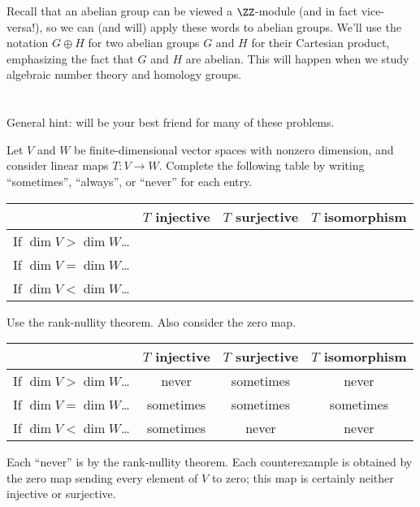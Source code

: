 \begin{abuse}
	Recall that an abelian group
	can be viewed a $\ZZ$-module (and in fact vice-versa!),
	so we can (and will) apply these words to abelian groups.
	We'll use the notation $G \oplus H$ for two abelian groups $G$ and $H$
	for their Cartesian product, emphasizing the fact that $G$ and $H$ are abelian.
	This will happen when we study algebraic number theory and homology groups.
\end{abuse}

\section{\problemhead}
General hint:
 will be your best friend
for many of these problems.

\begin{dproblem}
	Let $V$ and $W$ be finite-dimensional vector spaces
	with nonzero dimension, and consider linear maps $T \colon V \to W$.
	Complete the following table by writing
	``sometimes'', ``always'', or ``never'' for each entry.
	\begin{center}
	\begin{tabular}[h]{c|ccc}
		& $T$ injective & $T$ surjective & $T$ isomorphism \\ \hline
		If $\dim V > \dim W$\dots \\
		If $\dim V = \dim W$\dots \\
		If $\dim V < \dim W$\dots \\
	\end{tabular}
	\end{center}
	\begin{hint}
		Use the rank-nullity theorem.
		Also consider the zero map.
	\end{hint}
	\begin{sol}
		\begin{center}
		\begin{tabular}[h]{c|ccc}
		& $T$ injective & $T$ surjective & $T$ isomorphism \\ \hline
		If $\dim V > \dim W$\dots & never & sometimes & never\\
		If $\dim V = \dim W$\dots & sometimes & sometimes & sometimes \\
		If $\dim V < \dim W$\dots & sometimes & never & never \\
		\end{tabular}
		\end{center}
		Each ``never'' is by the rank-nullity theorem.
		Each counterexample is obtained by the zero map
		sending every element of $V$ to zero;
		this map is certainly neither injective or surjective.
	\end{sol}
\end{dproblem}

